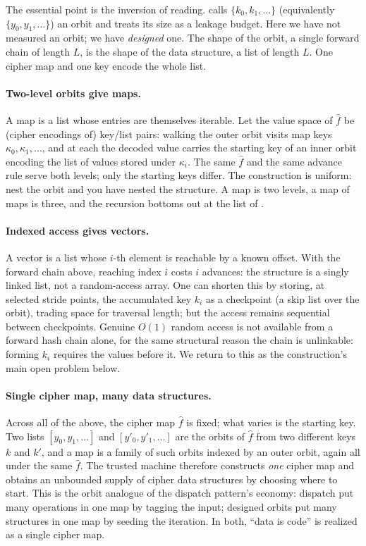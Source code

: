 \documentclass[11pt]{article}
\theoremstyle{definition}
\theoremstyle{plain}
\theoremstyle{definition}
\theoremstyle{remark}
\newcommand{\fhat}{\hat{f}}
\begin{document}
The essential point is the inversion of reading. 
calls $\{k_0, k_1, \ldots\}$ (equivalently $\{y_0, y_1, \ldots\}$) an
orbit and  treats its size as a leakage budget.
Here we have not measured an orbit; we have \emph{designed} one. The
shape of the orbit, a single forward chain of length $L$, is the shape
of the data structure, a list of length $L$. One cipher map and one
key encode the whole list.

\paragraph{Two-level orbits give maps.} A map is a list whose entries
are themselves iterable. Let the value space of $\fhat$ be (cipher
encodings of) key/list pairs: walking the outer orbit visits map keys
$\kappa_0, \kappa_1, \ldots$, and at each the decoded value carries the
starting key of an inner orbit encoding the list of values stored
under $\kappa_i$. The same $\fhat$ and the same advance rule serve both
levels; only the starting keys differ. The construction is uniform:
nest the orbit and you have nested the structure. A map is two levels,
a map of maps is three, and the recursion bottoms out at the list of
.

\paragraph{Indexed access gives vectors.} A vector is a list whose
$i$-th element is reachable by a known offset. With the forward chain
above, reaching index $i$ costs $i$ advances: the structure is a
singly linked list, not a random-access array. One can shorten this by
storing, at selected stride points, the accumulated key $k_{i}$ as a
checkpoint (a skip list over the orbit), trading space for traversal
length; but the access remains sequential between checkpoints. Genuine
$O(1)$ random access is not available from a forward hash chain alone,
for the same structural reason the chain is unlinkable: forming $k_i$
requires the values before it. We return to this as the construction's
main open problem below.

\paragraph{Single cipher map, many data structures.} Across all of the
above, the cipher map $\fhat$ is fixed; what varies is the starting
key. Two lists $[y_0, y_1, \ldots]$ and $[y'_0, y'_1, \ldots]$ are the
orbits of $\fhat$ from two different keys $k$ and $k'$, and a map is a
family of such orbits indexed by an outer orbit, again all under the
same $\fhat$. The trusted machine therefore constructs \emph{one}
cipher map and obtains an unbounded supply of cipher data structures by
choosing where to start. This is the orbit analogue of the dispatch
pattern's economy: dispatch put many operations in one map by tagging
the input; designed orbits put many structures in one map by seeding
the iteration. In both, \enquote{data is code} is realized as a single
cipher map.
\end{document}
